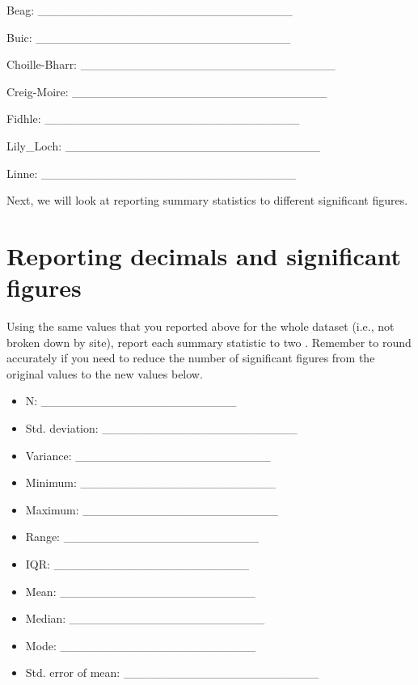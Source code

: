 \documentclass[
  openany]{krantz}
\providecommand{\tightlist}{%
  \setlength{\itemsep}{0pt}\setlength{\parskip}{0pt}}
\begin{document}
Beag: \_\_\_\_\_\_\_\_\_\_\_\_\_\_\_\_\_\_\_\_\_\_\_\_\_\_\_\_\_\_

Buic: \_\_\_\_\_\_\_\_\_\_\_\_\_\_\_\_\_\_\_\_\_\_\_\_\_\_\_\_\_\_

Choille-Bharr: \_\_\_\_\_\_\_\_\_\_\_\_\_\_\_\_\_\_\_\_\_\_\_\_\_\_\_\_\_\_

Creig-Moire: \_\_\_\_\_\_\_\_\_\_\_\_\_\_\_\_\_\_\_\_\_\_\_\_\_\_\_\_\_\_

Fidhle: \_\_\_\_\_\_\_\_\_\_\_\_\_\_\_\_\_\_\_\_\_\_\_\_\_\_\_\_\_\_

Lily\_Loch: \_\_\_\_\_\_\_\_\_\_\_\_\_\_\_\_\_\_\_\_\_\_\_\_\_\_\_\_\_\_

Linne: \_\_\_\_\_\_\_\_\_\_\_\_\_\_\_\_\_\_\_\_\_\_\_\_\_\_\_\_\_\_

Next, we will look at reporting summary statistics to different significant figures.

\hypertarget{reporting-decimals-and-significant-figures}{%
\section{Reporting decimals and significant figures}\label{reporting-decimals-and-significant-figures}}

Using the same values that you reported above for the whole dataset (i.e., not broken down by site), report each summary statistic to two .
Remember to round accurately if you need to reduce the number of significant figures from the original values to the new values below.

\begin{itemize}
\tightlist
\item
  N: \_\_\_\_\_\_\_\_\_\_\_\_\_\_\_\_\_\_\_\_\_\_\_
\item
  Std. deviation: \_\_\_\_\_\_\_\_\_\_\_\_\_\_\_\_\_\_\_\_\_\_\_
\item
  Variance: \_\_\_\_\_\_\_\_\_\_\_\_\_\_\_\_\_\_\_\_\_\_\_
\item
  Minimum: \_\_\_\_\_\_\_\_\_\_\_\_\_\_\_\_\_\_\_\_\_\_\_
\item
  Maximum: \_\_\_\_\_\_\_\_\_\_\_\_\_\_\_\_\_\_\_\_\_\_\_
\item
  Range: \_\_\_\_\_\_\_\_\_\_\_\_\_\_\_\_\_\_\_\_\_\_\_
\item
  IQR: \_\_\_\_\_\_\_\_\_\_\_\_\_\_\_\_\_\_\_\_\_\_\_
\item
  Mean: \_\_\_\_\_\_\_\_\_\_\_\_\_\_\_\_\_\_\_\_\_\_\_
\item
  Median: \_\_\_\_\_\_\_\_\_\_\_\_\_\_\_\_\_\_\_\_\_\_\_
\item
  Mode: \_\_\_\_\_\_\_\_\_\_\_\_\_\_\_\_\_\_\_\_\_\_\_
\item
  Std. error of mean: \_\_\_\_\_\_\_\_\_\_\_\_\_\_\_\_\_\_\_\_\_\_\_
\end{itemize}
\end{document}
